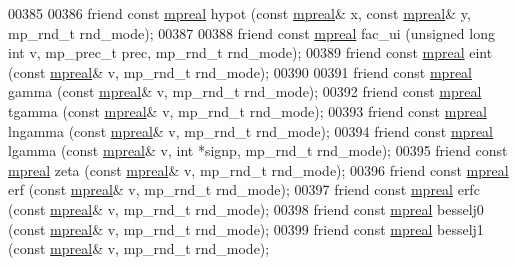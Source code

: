 \begin{DoxyCode}
00385 
00386     \textcolor{keyword}{friend} \textcolor{keyword}{const} \hyperlink{classmpfr_1_1mpreal}{mpreal} hypot (\textcolor{keyword}{const} \hyperlink{classmpfr_1_1mpreal}{mpreal}& x, \textcolor{keyword}{const} \hyperlink{classmpfr_1_1mpreal}{mpreal}& y, mp\_rnd\_t rnd\_mode);
00387 
00388     \textcolor{keyword}{friend} \textcolor{keyword}{const} \hyperlink{classmpfr_1_1mpreal}{mpreal} fac\_ui (\textcolor{keywordtype}{unsigned} \textcolor{keywordtype}{long} \textcolor{keywordtype}{int} v,  mp\_prec\_t prec, mp\_rnd\_t rnd\_mode);
00389     \textcolor{keyword}{friend} \textcolor{keyword}{const} \hyperlink{classmpfr_1_1mpreal}{mpreal} eint   (\textcolor{keyword}{const} \hyperlink{classmpfr_1_1mpreal}{mpreal}& v, mp\_rnd\_t rnd\_mode);
00390 
00391     \textcolor{keyword}{friend} \textcolor{keyword}{const} \hyperlink{classmpfr_1_1mpreal}{mpreal} gamma    (\textcolor{keyword}{const} \hyperlink{classmpfr_1_1mpreal}{mpreal}& v, mp\_rnd\_t rnd\_mode);
00392     \textcolor{keyword}{friend} \textcolor{keyword}{const} \hyperlink{classmpfr_1_1mpreal}{mpreal} tgamma   (\textcolor{keyword}{const} \hyperlink{classmpfr_1_1mpreal}{mpreal}& v, mp\_rnd\_t rnd\_mode);
00393     \textcolor{keyword}{friend} \textcolor{keyword}{const} \hyperlink{classmpfr_1_1mpreal}{mpreal} lngamma  (\textcolor{keyword}{const} \hyperlink{classmpfr_1_1mpreal}{mpreal}& v, mp\_rnd\_t rnd\_mode);
00394     \textcolor{keyword}{friend} \textcolor{keyword}{const} \hyperlink{classmpfr_1_1mpreal}{mpreal} lgamma   (\textcolor{keyword}{const} \hyperlink{classmpfr_1_1mpreal}{mpreal}& v, \textcolor{keywordtype}{int} *signp, mp\_rnd\_t rnd\_mode);
00395     \textcolor{keyword}{friend} \textcolor{keyword}{const} \hyperlink{classmpfr_1_1mpreal}{mpreal} zeta     (\textcolor{keyword}{const} \hyperlink{classmpfr_1_1mpreal}{mpreal}& v, mp\_rnd\_t rnd\_mode);
00396     \textcolor{keyword}{friend} \textcolor{keyword}{const} \hyperlink{classmpfr_1_1mpreal}{mpreal} erf      (\textcolor{keyword}{const} \hyperlink{classmpfr_1_1mpreal}{mpreal}& v, mp\_rnd\_t rnd\_mode);
00397     \textcolor{keyword}{friend} \textcolor{keyword}{const} \hyperlink{classmpfr_1_1mpreal}{mpreal} erfc     (\textcolor{keyword}{const} \hyperlink{classmpfr_1_1mpreal}{mpreal}& v, mp\_rnd\_t rnd\_mode);
00398     \textcolor{keyword}{friend} \textcolor{keyword}{const} \hyperlink{classmpfr_1_1mpreal}{mpreal} besselj0 (\textcolor{keyword}{const} \hyperlink{classmpfr_1_1mpreal}{mpreal}& v, mp\_rnd\_t rnd\_mode);
00399     \textcolor{keyword}{friend} \textcolor{keyword}{const} \hyperlink{classmpfr_1_1mpreal}{mpreal} besselj1 (\textcolor{keyword}{const} \hyperlink{classmpfr_1_1mpreal}{mpreal}& v, mp\_rnd\_t rnd\_mode);

\end{DoxyCode}
